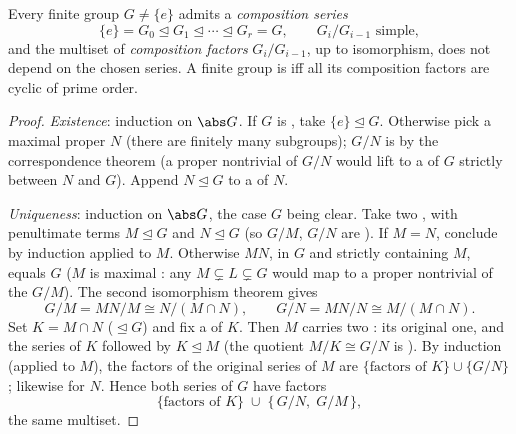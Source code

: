 \begin{theorem}\label{thm:b3:groups:jordanholder}
Every finite group $G \neq \{e\}$ admits a \emph{composition
series}
\[
\{e\} = G_0 \trianglelefteq G_1 \trianglelefteq \cdots
\trianglelefteq G_r = G,
\qquad G_{i}/G_{i-1} \text{ simple},
\]
and the multiset of \emph{composition factors} $G_i/G_{i-1}$, up
to isomorphism, does not depend on the chosen series. A finite
group is  iff all its composition factors are cyclic of
prime order.
\end{theorem}

\begin{proof}
\emph{Existence}: induction on $\abs G$. If $G$ is , take
$\{e\} \trianglelefteq G$. Otherwise pick a maximal proper  $N$ (there are finitely many subgroups); $G/N$ is 
by the correspondence theorem (a proper nontrivial 
of $G/N$ would lift to a  of $G$ strictly between
$N$ and $G$). Append $N \trianglelefteq G$ to a 
of $N$.

\emph{Uniqueness}: induction on $\abs G$, the case $G$ 
being clear. Take two , with penultimate terms
$M \trianglelefteq G$ and $N \trianglelefteq G$ (so $G/M$, $G/N$
are ). If $M = N$, conclude by induction applied to $M$.
Otherwise $MN$,  in $G$ and strictly containing $M$, equals
$G$ ($M$ is maximal : any  $M \subsetneq L
\subsetneq G$ would map to a proper nontrivial  of
the  $G/M$). The second isomorphism theorem gives
\[
G/M = MN/M \cong N/(M \cap N),
\qquad
G/N = MN/N \cong M/(M \cap N).
\]
Set $K = M \cap N$ ($\trianglelefteq G$) and fix a  of $K$. Then $M$ carries two : its
original one, and the series of $K$ followed by $K \trianglelefteq
M$ (the quotient $M/K \cong G/N$ is ). By induction (applied
to $M$), the factors of the original series of $M$ are
$\{\text{factors of } K\} \cup \{G/N\}$; likewise for $N$. Hence
both series of $G$ have factors
\[
\{\text{factors of } K\} \;\cup\; \{\,G/N,\; G/M\,\},
\]
the same multiset.


\end{proof}
